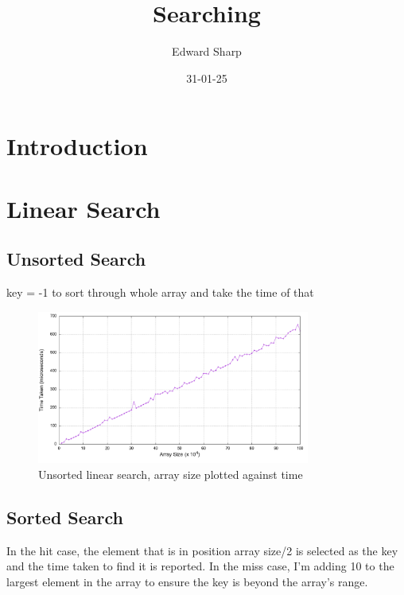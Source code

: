 \documentclass[a4paper,11pt]{article}
\begin{document}
\title{
    \textbf{Searching}
}
\author{Edward Sharp}
\date{31-01-25}

\maketitle

\section*{Introduction}

\section*{Linear Search}
\subsection*{Unsorted Search}

key = -1 to sort through whole array and take the time of that

\begin{figure}[h!]
  \centering
  \includegraphics[width=0.8\textwidth]{unsorted_search_plot}
  \caption{Unsorted linear search, array size plotted against time}
  \label{fig:unsorted_search_plot}
\end{figure}

\subsection*{Sorted Search}

In the hit case, the element that is in position array size/2 is selected as the key and the time taken to find it is reported.
In the miss case, I'm adding 10 to the largest element in the array to ensure the key is beyond the array's range.
\end{document}
